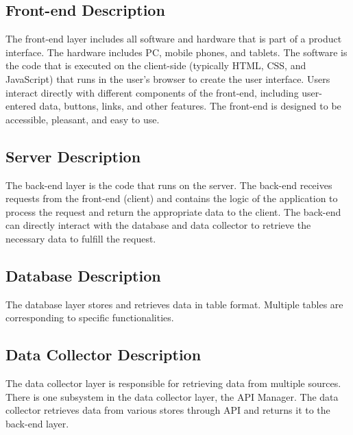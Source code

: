 \subsection{Front-end Description}
The front-end layer includes all software and hardware that is part of a product interface. The hardware includes PC, mobile phones, and tablets. The software is the code that is executed on the client-side (typically HTML, CSS, and JavaScript) that runs in the user's browser to create the user interface. Users interact directly with different components of the front-end, including user-entered data, buttons, links, and other features. The front-end is designed to be accessible, pleasant, and easy to use.

\subsection{Server Description}
The back-end layer is the code that runs on the server. The back-end receives requests from the front-end (client) and contains the logic of the application to process the request and return the appropriate data to the client. The back-end can directly interact with the database and data collector to retrieve the necessary data to fulfill the request. 

\subsection{Database Description}
The database layer stores and retrieves data in table format. Multiple tables are corresponding to specific functionalities. %

\subsection{Data Collector Description}
The data collector layer is responsible for retrieving data from multiple sources. There is one subsystem in the data collector layer, the API Manager. The data collector retrieves data from various stores through API and returns it to the back-end layer.
